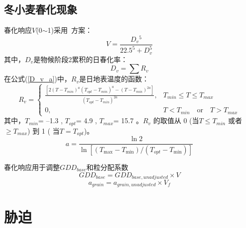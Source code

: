 \subsection{冬小麦春化现象}
春化响应$V$(0$\sim$1)采用~\citet{streck2003incorporating}方案：
\begin{equation}
V=\frac{D_{v}{ }^{5}}{22.5^{5}+D_{v}^{5}}
\end{equation}
其中，$D_v$是物候阶段2累积的日春化率：
\begin{equation}\label{D_v_a}
D_{v}=\sum R_{v}
\end{equation}
在公式(\ref{D_v_a})中，$R_{v}$是日地表温度的函数：
\begin{equation}
R_{v} = \begin{cases} 
\frac{\left[2\left(T-T_{min}\right)^{a}\left(T_{opt}-T_{min}\right)^{a} - \left(T-T_{min}\right)^{2a}\right]}{\left(T_{opt}-T_{min}\right)^{2a}}, &T_{min} \leqslant T \leqslant T_{max} \\
0,  &T<T_{min} \quad  \text{or} \quad T>T_{max}
\end{cases}
\end{equation}
其中，$T_{min}$= –1.3 \textcelsius, $T_{opt}$= 4.9 \textcelsius, $T_{max}$= 15.7 \textcelsius。$ R_v$ 的取值从 0 (当$ T\leqslant T_{min}$ 或者 $ \geqslant  T_{max}$) 到 1 ( 当$T=T_{opt}$)。
\begin{equation}
a=\frac{\ln 2}{\ln \left[\left(T_{\max }-T_{\min }\right) /\left(T_{o p t}-T_{\min }\right)\right]}
\end{equation}

春化响应用于调整$GDD_{base}$和粒分配系数
\begin{equation}
G D D_{b a s e}=G D D_{b a s e,  { unadjusted }} \times V
\end{equation}
\begin{equation}
a_{ {grain }}=a_{ {grain,unadjusted }} \times V_{f}
\end{equation}


\section{胁迫}
